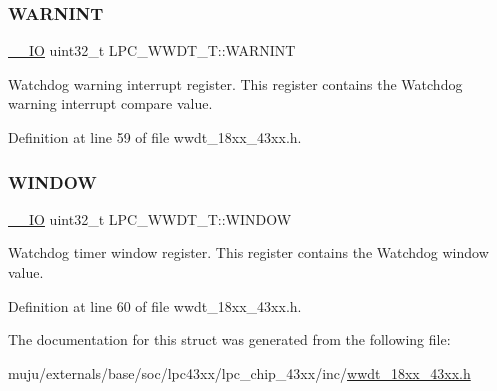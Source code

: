 \subsubsection{\texorpdfstring{W\+A\+R\+N\+I\+NT}{WARNINT}}
{\footnotesize\ttfamily \hyperlink{core__sc300_8h_aec43007d9998a0a0e01faede4133d6be}{\+\_\+\+\_\+\+IO} uint32\+\_\+t L\+P\+C\+\_\+\+W\+W\+D\+T\+\_\+\+T\+::\+W\+A\+R\+N\+I\+NT}

Watchdog warning interrupt register. This register contains the Watchdog warning interrupt compare value. 

Definition at line 59 of file wwdt\+\_\+18xx\+\_\+43xx.\+h.

\mbox{\label{struct_l_p_c___w_w_d_t___t_abcc1eca1d9cc366b693a5333fb75d1e0}} 
\subsubsection{\texorpdfstring{W\+I\+N\+D\+OW}{WINDOW}}
{\footnotesize\ttfamily \hyperlink{core__sc300_8h_aec43007d9998a0a0e01faede4133d6be}{\+\_\+\+\_\+\+IO} uint32\+\_\+t L\+P\+C\+\_\+\+W\+W\+D\+T\+\_\+\+T\+::\+W\+I\+N\+D\+OW}

Watchdog timer window register. This register contains the Watchdog window value. 

Definition at line 60 of file wwdt\+\_\+18xx\+\_\+43xx.\+h.



The documentation for this struct was generated from the following file\+:\begin{DoxyCompactItemize}
\item 
muju/externals/base/soc/lpc43xx/lpc\+\_\+chip\+\_\+43xx/inc/\hyperlink{wwdt__18xx__43xx_8h}{wwdt\+\_\+18xx\+\_\+43xx.\+h}\end{DoxyCompactItemize}
